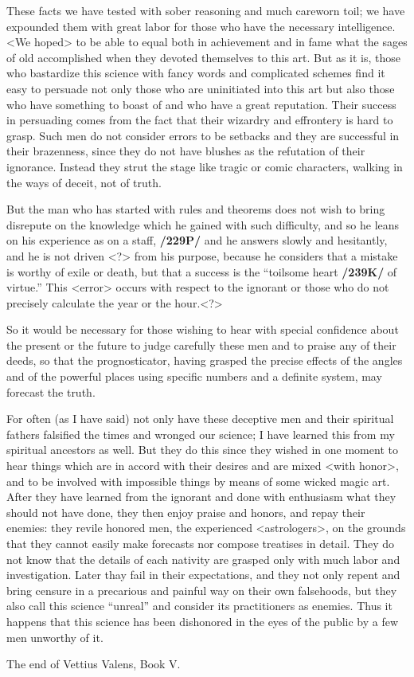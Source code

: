 These facts we have tested with sober reasoning and much careworn toil; we have expounded them with great labor for those who have the necessary intelligence. <We hoped> to be able to equal both in
achievement and in fame what the sages of old accomplished when they devoted themselves to this art. But as it is, those who bastardize this science with fancy words and complicated schemes find it easy to
persuade not only those who are uninitiated into this art but also those who have something to boast of and who have a great reputation. Their success in persuading comes from the fact that their wizardry and effrontery is hard to grasp. Such men do not consider errors to be setbacks and they are successful in their brazenness, since they do not have blushes as the refutation of their ignorance. Instead they strut the stage like tragic or comic characters, walking in the ways of deceit, not of truth. 

But the man who has started with rules and theorems does not wish to bring disrepute on the knowledge which he gained with such difficulty, and so he leans on his experience as on a staff, \textbf{/229P/} and he answers slowly and hesitantly, and he is not driven <?> from his purpose, because he considers that a mistake is worthy of exile or death, but that a success is the “toilsome heart \textbf{/239K/} of virtue.” This <error> occurs with respect to the ignorant or those who do not precisely calculate the year or the hour.<?>

So it would be necessary for those wishing to hear with special confidence about the present or the future to judge carefully these men and to praise any of their deeds, so that the prognosticator, having grasped the precise effects of the angles and of the powerful places using specific numbers and a definite system, may forecast the truth.

For often (as I have said) not only have these deceptive men and their spiritual fathers falsified the times and wronged our science; I have learned this from my spiritual ancestors as well. But they do this
since they wished in one moment to hear things which are in accord with their desires and are mixed <with honor>, and to be involved with impossible things by means of some wicked magic art. After they have learned from the ignorant and done with enthusiasm what they should not have done, they then enjoy praise and honors, and repay their enemies: they revile honored men, the experienced <astrologers>, on the grounds that they cannot easily make forecasts nor compose treatises in detail. They do not know that the
details of each nativity are grasped only with much labor and investigation. Later thay fail in their expectations, and they not only repent and bring censure in a precarious and painful way on their own
falsehoods, but they also call this science “unreal” and consider its practitioners as enemies. Thus it happens that this science has been dishonored in the eyes of the public by a few men unworthy of it.

The end of Vettius Valens, Book V.

\newpage
